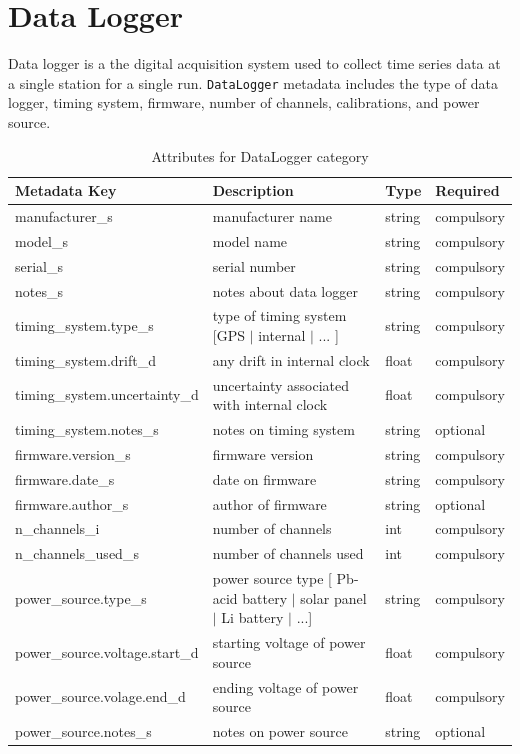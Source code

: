 \documentclass{article}
\begin{document}
\newpage
\section{Data Logger}

Data logger is a the digital acquisition system used to collect time series data at a single station for a single run.  \verb|DataLogger| metadata includes the type of data logger, timing system, firmware, number of channels, calibrations, and power source.

\begin{table}[htb!]
	\caption[Attributes for DataLogger]{Attributes for DataLogger category}
	\begin{tabular}{|l|p{3in}|l|l|}
		\hline
		\textbf{Metadata Key} & \textbf{Description} & \textbf{Type} & \textbf{Required} \\ \hline
		manufacturer\_s & manufacturer name & string & compulsory \\ \hline
		model\_s & model name & string & compulsory \\ \hline
		serial\_s & serial number & string & compulsory \\ \hline
		notes\_s & notes about data logger & string & compulsory \\ \hline
		timing\_system.type\_s & type of timing system [GPS $|$ internal $|$ ... ] & string & compulsory \\ \hline
		timing\_system.drift\_d & any drift in internal clock & float & compulsory \\ \hline
		timing\_system.uncertainty\_d & uncertainty associated with internal clock & float & compulsory \\ \hline
		timing\_system.notes\_s & notes on timing system & string & optional \\ \hline
		firmware.version\_s & firmware version & string & compulsory \\ \hline
		firmware.date\_s & date on firmware & string & compulsory \\ \hline
		firmware.author\_s & author of firmware & string & optional \\ \hline
		n\_channels\_i & number of channels & int & compulsory \\ \hline
		n\_channels\_used\_s & number of channels used & int & compulsory \\ \hline
		power\_source.type\_s & power source type [ Pb-acid battery $|$ solar panel $|$ Li battery $|$ ...] & string & compulsory \\ \hline
		power\_source.voltage.start\_d & starting voltage of power source & float & compulsory \\ \hline
		power\_source.volage.end\_d & ending voltage of power source & float & compulsory \\ \hline
		power\_source.notes\_s & notes on power source & string & optional \\ \hline
	\end{tabular}
	\label{tab:datalogger}
\end{table}	
\end{document}
